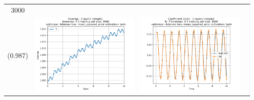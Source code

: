 \documentclass{article}
\begin{document}
\begin{tabular}{|c|c|c|c|}
     3000 \\ (0.987) &
     \includegraphics[scale=0.37]{./Searching_for_good_train_set_size/2_layers_simple_train_samples=3000_timestep=0.1_t_total=10.0_optimizer=Adamax_loss=mean_squared_error_activation=tanh/Overlap.png} &
     \includegraphics[scale=0.37]{./Searching_for_good_train_set_size/2_layers_simple_train_samples=3000_timestep=0.1_t_total=10.0_optimizer=Adamax_loss=mean_squared_error_activation=tanh/Coeff_N=7_(real).png} &

\end{tabular}
\end{document}
